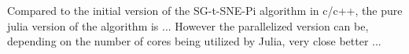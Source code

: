 Compared to the initial version of the SG-t-SNE-Pi algorithm in c/c++, the pure julia version of the algorithm 
is ... 
However the parallelized version can be, depending on the number of cores being utilized by Julia, very close better ...
